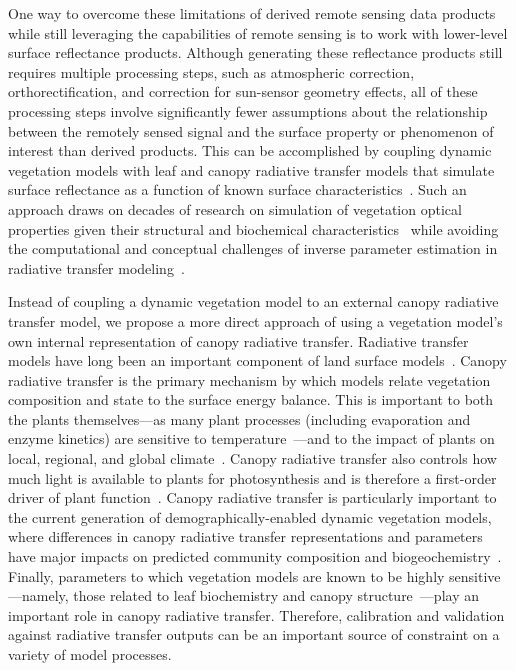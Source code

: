 One way to overcome these limitations of derived remote sensing data products while still leveraging the capabilities of remote sensing is to work with lower-level surface reflectance products.
Although generating these reflectance products still requires multiple processing steps, such as atmospheric correction, orthorectification, and correction for sun-sensor geometry effects, all of these processing steps involve significantly fewer assumptions about the relationship between the remotely sensed signal and the surface property or phenomenon of interest than derived products.
This can be accomplished by coupling dynamic vegetation models with leaf and canopy radiative transfer models that simulate surface reflectance as a function of known surface characteristics~\citep{knorr2001assimilation, nouvellon2001coupling, quaife2008assimilating}.
Such an approach draws on decades of research on simulation of vegetation optical properties given their structural and biochemical characteristics~\citep{dickinson1983land, sellers1985canopy, verhoef1984light, lewis2007spectral, jacquemoud2009prospect, pinty2004synergy, widlowski2007third, widlowski2015fourth, hogan_2018_fast} while avoiding the computational and conceptual challenges of inverse parameter estimation in radiative transfer modeling~\citep{combal2003retrieval, lewis2007spectral}.

Instead of coupling a dynamic vegetation model to an external canopy radiative transfer model, we propose a more direct approach of using a vegetation model's own internal representation of canopy radiative transfer.
Radiative transfer models have long been an important component of land surface models~\citep{dickinson1983land, sellers1985canopy}.
Canopy radiative transfer is the primary mechanism by which models relate vegetation composition and state to the surface energy balance.
This is important to both the plants themselves---as many plant processes (including evaporation and enzyme kinetics) are sensitive to temperature~\citep{serbin2011leaf}---and to the impact of plants on local, regional, and global climate~\citep{bonan2008forests}.
Canopy radiative transfer also controls how much light is available to plants for photosynthesis and is therefore a first-order driver of plant function~\citep{hikosaka1995model, robakowski_2004_growth, niinemets2016withincanopy, keenan2016global}.
Canopy radiative transfer is particularly important to the current generation of demographically-enabled dynamic vegetation models, where differences in canopy radiative transfer representations and parameters have major impacts on predicted community composition and biogeochemistry~\citep{loew_2014_do, fisher2018vegetation, viskari_2019_influence}.
Finally, parameters to which vegetation models are known to be highly sensitive---namely, those related to leaf biochemistry and canopy structure~\citep{dietze2014quantitative, raczka_2018_what, shiklomanov2020structurea}---play an important role in canopy radiative transfer.
Therefore, calibration and validation against radiative transfer outputs can be an important source of constraint on a variety of model processes.


